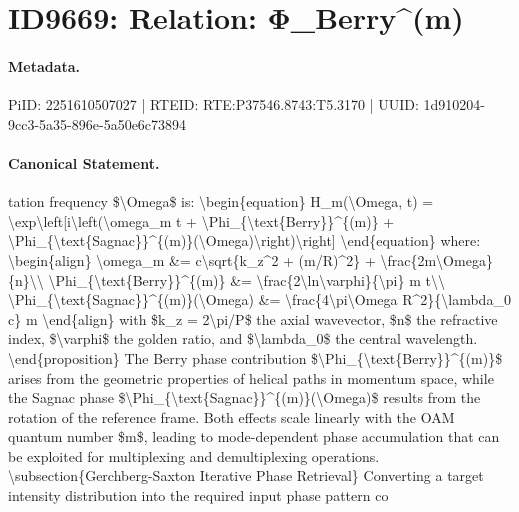 \section*{ID9669: Relation: Φ\_Berry\textasciicircum{}(m)}
\paragraph{Metadata.}
PiID: 2251610507027 | RTEID: RTE:P37546.8743:T5.3170 | UUID: 1d910204-9cc3-5a35-896e-5a50e6c73894

\paragraph{Canonical Statement.}
tation frequency \$\textbackslash{}Omega\$ is: \textbackslash{}begin\{equation\} H\_m(\textbackslash{}Omega, t) = \textbackslash{}exp\textbackslash{}left[i\textbackslash{}left(\textbackslash{}omega\_m t + \textbackslash{}Phi\_\{\textbackslash{}text\{Berry\}\}\textasciicircum{}\{(m)\} + \textbackslash{}Phi\_\{\textbackslash{}text\{Sagnac\}\}\textasciicircum{}\{(m)\}(\textbackslash{}Omega)\textbackslash{}right)\textbackslash{}right] \textbackslash{}end\{equation\} where: \textbackslash{}begin\{align\} \textbackslash{}omega\_m \&= c\textbackslash{}sqrt\{k\_z\textasciicircum{}2 + (m/R)\textasciicircum{}2\} + \textbackslash{}frac\{2m\textbackslash{}Omega\}\{n\}\textbackslash{}\textbackslash{} \textbackslash{}Phi\_\{\textbackslash{}text\{Berry\}\}\textasciicircum{}\{(m)\} \&= \textbackslash{}frac\{2\textbackslash{}ln\textbackslash{}varphi\}\{\textbackslash{}pi\} m t\textbackslash{}\textbackslash{} \textbackslash{}Phi\_\{\textbackslash{}text\{Sagnac\}\}\textasciicircum{}\{(m)\}(\textbackslash{}Omega) \&= \textbackslash{}frac\{4\textbackslash{}pi\textbackslash{}Omega R\textasciicircum{}2\}\{\textbackslash{}lambda\_0 c\} m \textbackslash{}end\{align\} with \$k\_z = 2\textbackslash{}pi/P\$ the axial wavevector, \$n\$ the refractive index, \$\textbackslash{}varphi\$ the golden ratio, and \$\textbackslash{}lambda\_0\$ the central wavelength. \textbackslash{}end\{proposition\} The Berry phase contribution \$\textbackslash{}Phi\_\{\textbackslash{}text\{Berry\}\}\textasciicircum{}\{(m)\}\$ arises from the geometric properties of helical paths in momentum space, while the Sagnac phase \$\textbackslash{}Phi\_\{\textbackslash{}text\{Sagnac\}\}\textasciicircum{}\{(m)\}(\textbackslash{}Omega)\$ results from the rotation of the reference frame. Both effects scale linearly with the OAM quantum number \$m\$, leading to mode-dependent phase accumulation that can be exploited for multiplexing and demultiplexing operations. \textbackslash{}subsection\{Gerchberg-Saxton Iterative Phase Retrieval\} Converting a target intensity distribution into the required input phase pattern co


